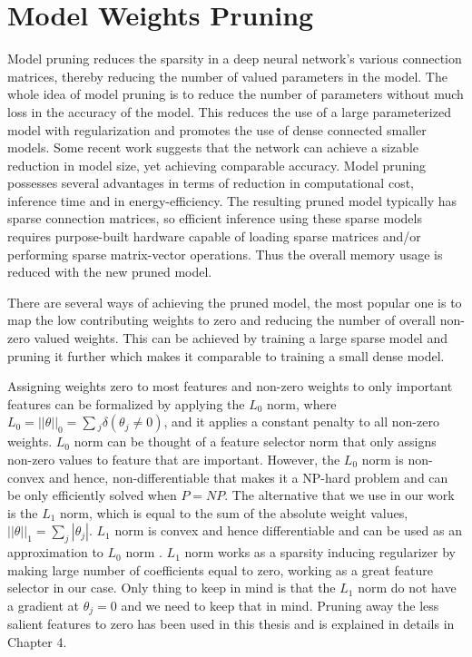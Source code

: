 \section{Model Weights Pruning}

Model pruning reduces the sparsity in a deep neural network's
various connection matrices, thereby reducing the number of valued parameters in the model. The whole idea of model pruning is to reduce the number of parameters without much loss in the accuracy of the model. This reduces the use of a large parameterized model with regularization and promotes the use of dense connected smaller models. Some recent work suggests \cite{DBLP:journals/corr/HanMD15} \cite{DBLP:journals/corr/NarangDSE17} that the network can achieve a sizable reduction in model size, yet achieving comparable accuracy. 
Model pruning possesses several advantages in terms of reduction in computational cost, inference time and in energy-efficiency. The resulting pruned model typically has sparse connection matrices, so
efficient inference using these sparse models requires purpose-built hardware capable of loading sparse matrices and/or performing sparse matrix-vector operations. Thus the overall memory usage is reduced with the new pruned model. 


There are several ways of achieving the pruned model, the most popular one is to map the low contributing weights to zero and reducing the number of overall non-zero valued weights. This can be achieved by training a large sparse model and pruning it further which makes it comparable to training a small dense model.

Assigning weights zero to most features and non-zero weights to only important features can be formalized by applying the $L_0$ norm, where $L_0 = ||\theta||_0 = \sum{_j} \delta (\theta_j \neq 0)$, and it applies a constant penalty to all non-zero weights. 
$L_0$ norm can be thought of a feature selector norm that only assigns non-zero values to feature that are important. However, the $L_0$ norm is non-convex and hence, non-differentiable that makes it a NP-hard problem and can be only efficiently solved when $P = NP$.
The alternative that we use in our work is the $L_1$ norm, which is equal to the sum of the absolute weight values, $||\theta||_1 = \sum_j |\theta_j|$. $L_1$ norm is convex and hence differentiable and can be used as an approximation to $L_0$ norm  \cite{tibshirani1996regression}. $L_1$ norm works as a sparsity inducing regularizer by making large number of coefficients equal to zero, working as a great feature selector in our case. Only thing to keep in mind is that the $L_1$ norm do not have a gradient at $\theta_j = 0$ and we need to keep that in mind. 
Pruning away the less salient features to zero has been used in this thesis and is explained in details in Chapter 4. 


